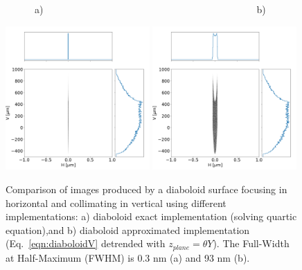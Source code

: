 \documentclass{iucr}              %
\begin{document}
\begin{figure}\label{fig:pointToSegment}
\flushleft
~~~~~~a)~~~~~~~~~~~~~~~~~~~~~~~~~~~~~~~~~~~~~~~~~~~~b)\\
\centering

\includegraphics[width=0.49\textwidth]{figures/p2s_V_z.png}
\includegraphics[width=0.49\textwidth]{figures/p2s_K_z.png} \\
\flushleft
\caption{Comparison of images produced by a diaboloid surface focusing in horizontal and collimating in vertical using different implementations: a) diaboloid exact implementation (solving quartic equation),and b) diaboloid approximated implementation (Eq.~\ref{eqn:diaboloidV} detrended with $z_{plane}=\theta Y$).
The Full-Width at Half-Maximum (FWHM) is 0.3 nm (a) and 93 nm (b). %
}
\end{figure}
\end{document}
